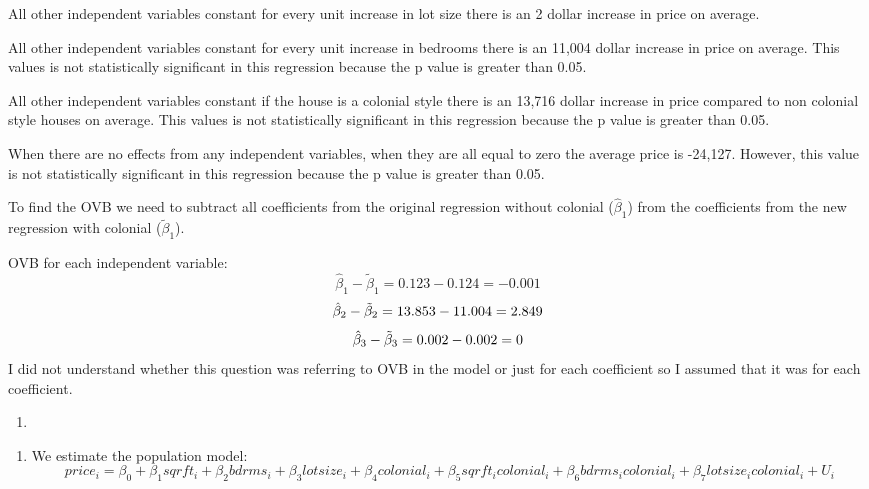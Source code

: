 \documentclass[
  12pt,
  landscape]{article}
\providecommand{\tightlist}{%
  \setlength{\itemsep}{0pt}\setlength{\parskip}{0pt}}
\begin{document}
All other independent variables constant for every unit increase in lot
size there is an 2 dollar increase in price on average.

All other independent variables constant for every unit increase in
bedrooms there is an 11,004 dollar increase in price on average. This
values is not statistically significant in this regression because the p
value is greater than 0.05.

All other independent variables constant if the house is a colonial
style there is an 13,716 dollar increase in price compared to non
colonial style houses on average. This values is not statistically
significant in this regression because the p value is greater than 0.05.

When there are no effects from any independent variables, when they are
all equal to zero the average price is -24,127. However, this value is
not statistically significant in this regression because the p value is
greater than 0.05.

To find the OVB we need to subtract all coefficients from the original
regression without colonial (\(\hat\beta_1\)) from the coefficients from
the new regression with colonial (\(\tilde\beta_1\)).

OVB for each independent variable: \[
\hat\beta_1- \tilde\beta_1 =  0.123 - 0.124 = -0.001
\] \[
\hat\beta_2- \tilde\beta_2 = 13.853 - 11.004 = 2.849 \\
\] \[
\hat\beta_3- \tilde\beta_3 = 0.002 -0.002 = 0\\
\] I did not understand whether this question was referring to OVB in
the model or just for each coefficient so I assumed that it was for each
coefficient.

\begin{enumerate}
\def\labelenumi{(\alph{enumi})}
\setcounter{enumi}{5}
\item
\end{enumerate}

\begin{enumerate}
\def\labelenumi{\roman{enumi})}
\tightlist
\item
  We estimate the population model: \[
  price_i = \beta_0 + \beta_1sqrft_i + \beta_2bdrms_i + \beta_3lotsize_i +\beta_4colonial_i + \beta_5sqrft_icolonial_i + \beta_6bdrms_icolonial_i + \beta_7lotsize_icolonial_i + U_i
  \]
\end{enumerate}
\end{document}
